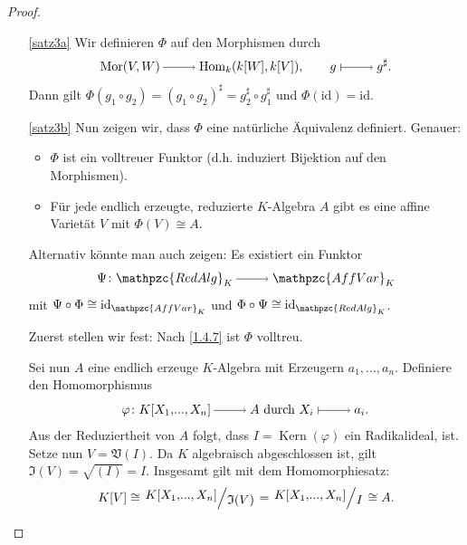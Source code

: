 \documentclass[a4paper,12pt,index=toc]{scrbook}
\theoremstyle{keinenummern} %
\def\V{\mathfrak{V}}
\def\I{\mathfrak{I}}
\newcommand{\AffVar}{\mathpzc{AffVar}}
\newcommand{\RedAlg}{\mathpzc{RedAlg}}
\newcommand{\Hom}{\mathrm{Hom}}
\newcommand{\Mor}{\mathrm{Mor}}
\newcommand{\Kern}{\operatorname{Kern}}
\newcommand{\id}{\mathrm{id}}
\renewcommand{\phi}{\varphi}
\renewcommand{\dotsc}{\ensuremath{\!...}}
\newcommand{\polyx}[1][n]{\ensuremath%
  [X_{1},\dotsc,X_{#1}]}
\begin{document}
\begin{proof}
\begin{enumerate}
\item[\ref{satz3a}] Wir definieren $\Phi$ auf den Morphismen durch 
\begin{equation*}\Mor(V,W)\ra \Hom_k(k[W],k[V]), \qquad g\mapsto g^{\sharp}.\end{equation*}
Dann gilt $\Phi(g_1\circ g_2)=(g_1\circ g_2)^{\sharp}=g_2^\sharp\circ g_1^\sharp$ und $\Phi(\id)=\id$.
\item[\ref{satz3b}] Nun zeigen wir, dass $\Phi$ eine natürliche Äquivalenz definiert. Genauer: 
\begin{itemize}
\item $\Phi$ ist ein volltreuer Funktor (d.h. induziert Bijektion auf den Morphismen).
\item Für jede endlich erzeugte, reduzierte $K$-Algebra $A$ gibt es eine affine Varietät $V$ mit $\Phi(V)\cong A$. 
\end{itemize}
Alternativ könnte man auch zeigen: Es existiert ein Funktor 
\begin{equation*}\Psi\colon  \RedAlg_K\ra \AffVar_K\end{equation*} mit $\Psi\circ \Phi\cong \id_{\AffVar_K}$ und $\Phi\circ \Psi\cong \id_{\RedAlg_K}$.

Zuerst stellen wir fest: Nach \cref{1.4.7} ist $\Phi$ volltreu. 

Sei nun $A$ eine endlich erzeuge $K$-Algebra mit Erzeugern $a_1,\dotsc,a_n$.
Definiere den Homomorphismus 
\begin{equation*}\phi\colon  K\polyx\ra A\text{ durch }X_i\mapsto a_i.\end{equation*}
Aus der Reduziertheit von $A$ folgt, dass
$I=\Kern(\phi)$ ein Radikalideal, ist. Setze nun $V=\V(I)$. Da $K$ algebraisch abgeschlossen ist, gilt $\I(V)=\sqrt{(I)}=I$. Insgesamt gilt mit dem Homomorphiesatz:
\begin{equation*}K[V]\cong\Quotient{K\polyx}{\I(V)}=\Quotient{K\polyx}{I}\cong A.\end{equation*}
\end{enumerate}
\end{proof}
\end{document}
